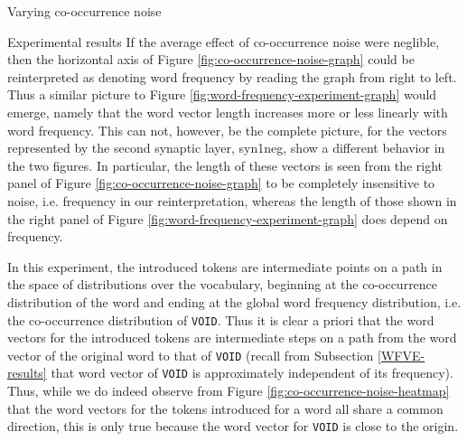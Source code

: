\documentclass{article} %
\newcommand{\word}[1]{\texttt{#1}}
\begin{document}
\begin{section}{Varying co-occurrence noise}
\begin{subsection}{Experimental results}
If the average effect of co-occurrence noise were neglible, then the horizontal axis of Figure \ref{fig:co-occurrence-noise-graph} could be reinterpreted as
denoting word frequency by reading the graph from right to left.
Thus a similar picture to Figure \ref{fig:word-frequency-experiment-graph} would emerge, namely that the
word vector length increases more or less linearly with word frequency.
This can not, however, be the complete picture, for the vectors
represented by the second synaptic layer, syn1neg, show a different
behavior in the two figures.  In particular, the length of these vectors
is seen from the right panel of Figure \ref{fig:co-occurrence-noise-graph}
to be completely insensitive to noise, i.e. frequency in our
reinterpretation, whereas the length of those shown in the right panel
of Figure \ref{fig:word-frequency-experiment-graph} does depend on
frequency.

In this experiment, the introduced tokens are intermediate points on a path in the space of distributions over the vocabulary, beginning at the co-occurrence distribution of the word and ending at the global word frequency distribution, i.e. the co-occurrence distribution of \word{VOID}.
Thus it is clear a priori that the word vectors for the introduced tokens are intermediate steps on a path from the word vector of the original word to that of \word{VOID} (recall from Subsection \ref{WFVE-results} that word vector of \word{VOID} is approximately independent of its frequency).
Thus, while we do indeed observe from Figure \ref{fig:co-occurrence-noise-heatmap} that the word vectors for the tokens introduced for a word all share a common direction, this is only true because the word vector for \word{VOID} is close to the origin.


\end{subsection}
\end{section}
\end{document}
